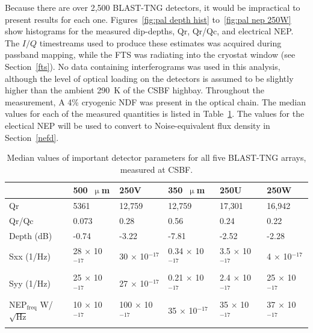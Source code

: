 Because there are over 2,500 BLAST-TNG detectors, it would be impractical to present results for each one. Figures~\ref{fig:pal depth hist} to~\ref{fig:pal nep 250W} show histograms for the measured dip-depths, \gls{Qr}, \gls{Qr}/\gls{Qc}, and electrical NEP. The $I/Q$ timestreams used to produce these estimates was acquired during passband mapping, while the FTS was radiating into the cryostat window (see Section~\ref{fts}). No data containing interferograms was used in this analysis, although the level of optical loading on the detectors is assumed to be slightly higher than the ambient 290~K of the CSBF highbay. Throughout the measurement, A 4\% cryogenic NDF was present in the optical chain. The median values for each of the measured quantities is listed in Table~\ref{table:palestine hists}. The values for the electical NEP will be used to convert to Noise-equivalent flux density in Section~\ref{nefd}.

\begin{table}[!htbp]
\centering
\caption[~Median values of important detector parameters for all five BLAST-TNG arrays, measured at CSBF.]{Median values of important detector parameters for all five BLAST-TNG arrays, measured at CSBF.}
\label{table:palestine hists}
\begin{tabular}{@{}llllll@{}}
\dtoprule
 & 500~$\upmu$m & 250V & 350~$\upmu$m & 250U & 250W \\ \midrule
\gls{Qr} & 5361 & 12,759 & 12,759 & 17,301 & 16,942 \\
\gls{Qr}/\gls{Qc} & 0.073 & 0.28 & 0.56 & 0.24 & 0.22 \\
Depth (dB) & -0.74 & -3.22 & -7.81 & -2.52 & -2.28 \\
\gls{Sxx} (1/Hz) & 28 $\times$ 10$^{-17}$ & 30 $\times$ 10$^{-17}$ & 0.34 $\times$ 10$^{-17}$ & 3.5 $\times$ 10$^{-17}$ & 4 $\times$ 10$^{-17}$ \\
\gls{Syy} (1/Hz) & 25 $\times$ 10$^{-17}$ & 27 $\times$ 10$^{-17}$ & 0.21 $\times$ 10$^{-17}$ & 2.4 $\times$ 10$^{-17}$ & 25 $\times$ 10$^{-17}$ \\
NEP$_{\mathrm{freq}}$ W/$\sqrt{\mathrm{Hz}}$ & 10 $\times$ 10$^{-17}$ & 100 $\times$ 10$^{-17}$ & 35 $\times$ 10$^{-17}$ & 35 $\times$ 10$^{-17}$ & 37 $\times$ 10$^{-17}$ \\ \dbottomrule
\\
\end{tabular}
\end{table}

